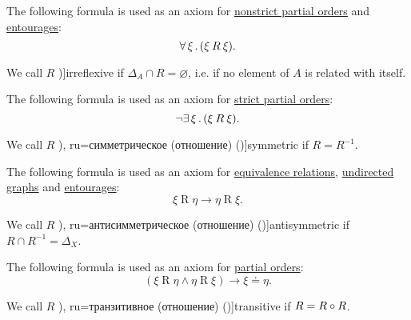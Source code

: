 \begin{definition}
\begin{thmenum}[resume=def:binary_relation]
    The following formula is used as an axiom for \hyperref[def:strict_partial_order]{nonstrict partial orders} and \hyperref[def:entourage]{entourages}:
    \begin{equation}\label{eq:def:binary_relation/reflexive}
      \forall \thinspace \xi \thinspace . \thinspace (\xi \mathbin{R} \xi).
    \end{equation}

     We call \( R \) \term[ru=антирефлексивное (отношение) (\cite[def. 2.7]{Гуров2013})]{irreflexive} if \( \Delta_A \cap R = \varnothing \), i.e. if no element of \( A \) is related with itself.

    The following formula is used as an axiom for \hyperref[def:strict_partial_order]{strict partial orders}:
    \begin{equation}\label{eq:def:binary_relation/irreflexive}
      \neg \exists \thinspace \xi \thinspace . \thinspace (\xi \mathbin{R} \xi).
    \end{equation}

     We call \( R \) \term[bg=симетрична (релация) (\cite[369]{ГеновМиховскиМоллов1991}), ru=симметрическое (отношение) (\cite[def. 2.7]{Гуров2013})]{symmetric} if \( R = R^{-1} \).

    The following formula is used as an axiom for \hyperref[def:equivalence_relation]{equivalence relations}, \hyperref[def:undirected_multigraph]{undirected graphs} and \hyperref[def:entourage]{entourages}:
    \begin{equation}\label{eq:def:binary_relation/symmetric}
      \xi \mathbin{R} \eta \rightarrow \eta \mathbin{R} \xi.
    \end{equation}

     We call \( R \) \term[bg=антисиметрична (релация) (\cite[369]{ГеновМиховскиМоллов1991}), ru=антисимметрическое (отношение) (\cite[def. 2.7]{Гуров2013})]{antisymmetric} if \( R \cap R^{-1} = \Delta_X \).

    The following formula is used as an axiom for \hyperref[def:partially_ordered_set]{partial orders}:
    \begin{equation}\label{eq:def:binary_relation/antisymmetric}
      (\xi \mathbin{R} \eta \wedge \eta \mathbin{R} \xi) \rightarrow \xi \doteq \eta.
    \end{equation}

     We call \( R \) \term[bg=транзитивна (релация) (\cite[369]{ГеновМиховскиМоллов1991}), ru=транзитивное (отношение) (\cite[def. 2.7]{Гуров2013})]{transitive} if \( R = R \bincirc R \).


\end{thmenum}
\end{definition}
